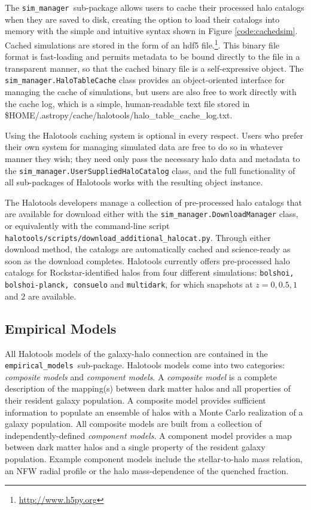 \documentclass[twocolumn, tighten]{aastex6}
\newcommand{\emodels}{{\tt empirical\_models }}
\newcommand{\sims}{{\tt sim\_manager }}
\begin{document}
The \sims sub-package allows users to cache their processed halo catalogs when they are saved to disk, creating the option to load their catalogs into memory with the simple and intuitive syntax shown in Figure \ref{code:cachedsim}. Cached simulations are stored in the form of an hdf5 file.\footnote{\url{http://www.h5py.org}}\citep{hdf5}. This binary file format is fast-loading and permits metadata to be bound directly to the file in a transparent manner, so that the cached binary file is a self-expressive object. The {\tt sim\_manager.HaloTableCache} class provides an object-oriented interface for managing the cache of simulations, but users are also free to work directly with the cache log, which is a simple, human-readable text file stored in \$HOME/.astropy/cache/halotools/halo\_table\_cache\_log.txt.

Using the Halotools caching system is optional in every respect. Users who prefer their own system for managing simulated data are free to do so in whatever manner they wish; they need only pass the necessary halo data and metadata to the {\tt sim\_manager.UserSuppliedHaloCatalog} class, and the full functionality of all sub-packages of Halotools works with the resulting object instance.  

The Halotools developers manage a collection of pre-processed halo catalogs that are available for download either with the {\tt sim\_manager.DownloadManager} class, or equivalently with the command-line script {\tt halotools/scripts/download\_additional\_halocat.py}. Through either download method, the catalogs are automatically cached and science-ready as soon as the download completes. Halotools currently offers pre-processed halo catalogs for Rockstar-identified halos from four different simulations: {\tt bolshoi, bolshoi-planck, consuelo} and {\tt multidark}, for which snapshots at $z=0, 0.5, 1$ and $2$ are available.

\subsection{Empirical Models}
\label{subsection:empirical_models}

All Halotools models of the galaxy-halo connection are contained in the \emodels sub-package. Halotools models come into two categories: {\em composite models} and {\em component models}. 
A {\em composite model} is a complete description of the mapping(s) between dark matter halos and all properties of their resident galaxy population. A composite model provides sufficient information to populate an ensemble of halos with a Monte Carlo realization of a galaxy population. All composite models are built from a collection of independently-defined {\em component models}. A component model provides a map between dark matter halos and a single property of the resident galaxy population. Example component models include the stellar-to-halo mass relation, an NFW radial profile or the halo mass-dependence of the quenched fraction.
\end{document}
